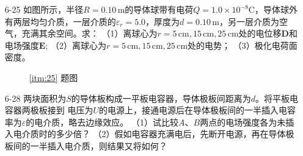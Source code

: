 \documentclass[UTF-8]{ctexart}
\makeatletter
\newcommand\mlabel[2]{#2\def\@currentlabel{#2}\label{#1}}
\makeatother
\begin{document}
\begin{enumerate}
    \item[\mlabel{itm:25}{6-25}] 如图所示，半径\(R=0.10\,\mathrm{m}\)的导体球带有电荷\(Q=1.0\times 10^{-8}\mathrm{C}\)，导体球外
        有两层均匀介质，一层介质的\(\varepsilon_r=5.0\)，厚度为\(d=0.10\,\mathrm{m}\)，另一层介质为空气，充满其余空间。求：
        （1）离球心为\(r=5\,\mathrm{cm},15\,\mathrm{cm},25\,\mathrm{cm}\)处的电位移\(\bm{D}\)和电场强度\(\bm{E}\);
        （2）离球心为\(r=5\,\mathrm{cm},15\,\mathrm{cm},25\,\mathrm{cm}\)处的电势；
        （3）极化电荷面密度。
        \begin{figure}[htb]
            \centering
            \begin{minipage}[b]{0.4\textwidth}
                \centering
                \caption*{\ref{itm:25} 题图}
            \end{minipage}
            \begin{minipage}[b]{0.4\textwidth}
            \end{minipage}
        \end{figure}
    
    \item[\mlabel{itm:28}{6-28}] 两块面积为\(S\)的导体板构成一平板电容器，导体极板间距离为\(d\)。将平板电容器两极板接到
        电压为\(U\)的电源上，接通电源后在导体极板间的一半插入电容率为\(\varepsilon\)的电介质，略去边缘效应。
        （1）试比较\(A\)、\(B\)两点的电场强度各为未插入电介质时的多少倍？
        （2）假如电容器充满电后，先断开电源，再在导体极板间的一半插入电介质，则结果又将如何？
        

\end{enumerate}
\end{document}
